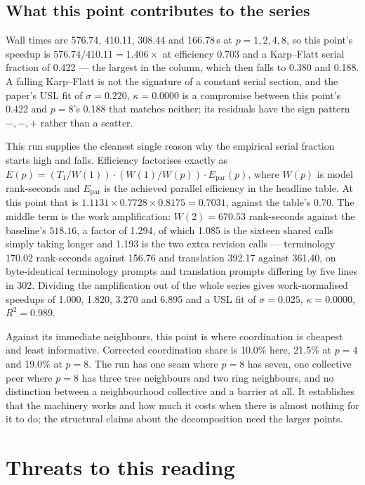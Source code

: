 \documentclass[11pt]{article}
\begin{document}
\subsection*{What this point contributes to the series}

Wall times are 576.74, 410.11, 308.44 and 166.78\,s at $p=1,2,4,8$, so this point's speedup is
$576.74/410.11 = 1.406\times$ at efficiency 0.703 and a Karp--Flatt serial fraction of 0.422 ---
the largest in the column, which then falls to 0.380 and 0.188. A falling Karp--Flatt is not the
signature of a constant serial section, and the paper's USL fit of $\sigma=0.220$, $\kappa=0.0000$
is a compromise between this point's 0.422 and $p=8$'s 0.188 that matches neither; its residuals
have the sign pattern $-,-,+$ rather than a scatter.

This run supplies the cleanest single reason why the empirical serial fraction starts high and
falls. Efficiency factorises exactly as
$E(p) = (T_1/W(1))\cdot(W(1)/W(p))\cdot E_{\mathrm{par}}(p)$, where $W(p)$ is model rank-seconds
and $E_{\mathrm{par}}$ is the achieved parallel efficiency in the headline table. At this point
that is $1.1131\times0.7728\times0.8175=0.7031$, against the table's 0.70. The middle term is the
work amplification: $W(2)=670.53$ rank-seconds against the baseline's $518.16$, a factor of 1.294,
of which 1.085 is the sixteen shared calls simply taking longer and 1.193 is the two extra
revision calls --- terminology 170.02 rank-seconds against 156.76 and translation 392.17 against 361.40,
on byte-identical terminology prompts and translation prompts differing by five lines in 302.
Dividing the amplification out of the whole series gives work-normalised speedups of 1.000, 1.820,
3.270 and 6.895 and a USL fit of $\sigma=0.025$, $\kappa=0.0000$, $R^2=0.989$.

Against its immediate neighbours, this point is where coordination is cheapest and least
informative. Corrected coordination share is 10.0\% here, 21.5\% at $p=4$ and 19.0\% at $p=8$. The
run has one seam where $p=8$ has seven, one collective peer where $p=8$ has three tree neighbours
and two ring neighbours, and no distinction between a neighbourhood collective and a barrier at
all. It establishes that the machinery works and how much it costs when there is almost nothing
for it to do; the structural claims about the decomposition need the larger points.

\section{Threats to this reading}
\end{document}
